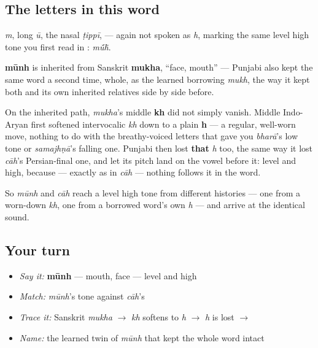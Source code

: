 \subsection*{The letters in this word}
\textbf{} \emph{m}, \textbf{} long \emph{ū}, \textbf{} the nasal \emph{ṭippī}, \textbf{} — again not spoken as \emph{h}, marking the same level high tone you first read in \textbf{}: \emph{mū́h̃}.

\begin{cousinweb}
\textbf{mūnh} is inherited from Sanskrit \textbf{mukha}, \textquotedblleft{}face, mouth\textquotedblright{} — Punjabi also kept the same word a second time, whole, as the learned borrowing \textbf{} \emph{mukh}, the way it kept both \emph{} and its own inherited relatives side by side before.

On the inherited path, \emph{mukha}'s middle \textbf{kh} did not simply vanish. Middle Indo-Aryan first softened intervocalic \emph{kh} down to a plain \textbf{h} — a regular, well-worn move, nothing to do with the breathy-voiced letters that gave you \emph{bharā}'s low tone or \emph{samajhṇā}'s falling one. Punjabi then lost \textbf{that} \emph{h} too, the same way it lost \emph{cāh}'s Persian-final one, and let its pitch land on the vowel before it: level and high, because — exactly as in \emph{cāh} — nothing follows it in the word.

So \emph{mūnh} and \emph{cāh} reach a level high tone from different histories — one from a worn-down \emph{kh}, one from a borrowed word's own \emph{h} — and arrive at the identical sound.
\end{cousinweb}

\subsection*{Your turn}
\begin{itemize}
\raggedright
  \item \emph{Say it:} \textbf{mūnh} — mouth, face — level and high
  \item \emph{Match:} \emph{mūnh}'s tone against \emph{cāh}'s
  \item \emph{Trace it:} Sanskrit \emph{mukha} $\to$ \emph{kh} softens to \emph{h} $\to$ \emph{h} is lost $\to$ \textbf{}
  \item \emph{Name:} the learned twin of \emph{mūnh} that kept the whole word intact
\end{itemize}

